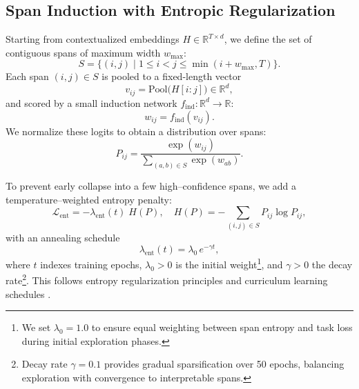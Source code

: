 \subsection{Span Induction with Entropic Regularization}
\label{sec:span-induction}

Starting from contextualized embeddings \(H\in\mathbb{R}^{T\times d}\), we define the set of contiguous spans of maximum width \(w_{\max}\):
\begin{equation}
	S = \bigl\{(i,j)\;\big|\;1\le i<j\le \min(i+w_{\max},T)\bigr\}.
	\label{eq:contiguous_span_set}
\end{equation}
Each span \((i,j)\in S\) is pooled to a fixed-length vector
\[
v_{ij} = \mathrm{Pool}\bigl(H[i:j]\bigr)\in\mathbb{R}^d,
\]
and scored by a small induction network \(f_{\mathrm{ind}}:\mathbb{R}^d\to\mathbb{R}\):
\[
w_{ij} = f_{\mathrm{ind}}(v_{ij}).
\]
We normalize these logits to obtain a distribution over spans:
\begin{equation}
	P_{ij}
	= \frac{\exp(w_{ij})}
	{\sum_{(a,b)\in S}\exp(w_{ab})}.
	\label{eq:span_softmax}
\end{equation}

To prevent early collapse into a few high–confidence spans, we add a temperature–weighted entropy penalty:
\begin{equation}
	\mathcal{L}_{\mathrm{ent}}
	= -\lambda_{\mathrm{ent}}(t)\;H(P),
	\quad
	H(P) = -\sum_{(i,j)\in S}P_{ij}\log P_{ij},
	\label{eq:entropy_term}
\end{equation}
with an annealing schedule
\begin{equation}
	\lambda_{\mathrm{ent}}(t)
	= \lambda_0\,e^{-\gamma t},
	\label{eq:entropy_decay}
\end{equation}
where \(t\) indexes training epochs, \(\lambda_0>0\) is the initial weight\footnote{We set $\lambda_0 = 1.0$ to ensure equal weighting between span entropy and task loss during initial exploration phases.}, and \(\gamma>0\) the decay rate\footnote{Decay rate $\gamma = 0.1$ provides gradual sparsification over 50 epochs, balancing exploration with convergence to interpretable spans.}.  This follows entropy regularization principles \cite{grandvalet2005semi,pereyra2017regularizing} and curriculum learning schedules \cite{bengio2009curriculum,kreutzer2021distilling}.

